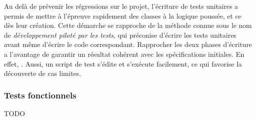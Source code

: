 Au delà de prévenir les régressions sur le projet, l'écriture de tests unitaires a permis de mettre à l'épreuve rapidement des classes à la logique poussée, et ce dès leur création. Cette démarche se rapproche de la méthode connue sous le nom de \emph{développement piloté par les tests}, qui préconise d'écrire les tests unitaires avant même d'écrire le code correspondant. Rapprocher les deux phases d'écriture a l'avantage de garantir un résultat cohérent avec les spécifications initiales. En effet, . Aussi, un script de test s'édite et s'exécute facilement, ce qui favorise la découverte de cas limites.


\subsubsection{Tests fonctionnels}

TODO